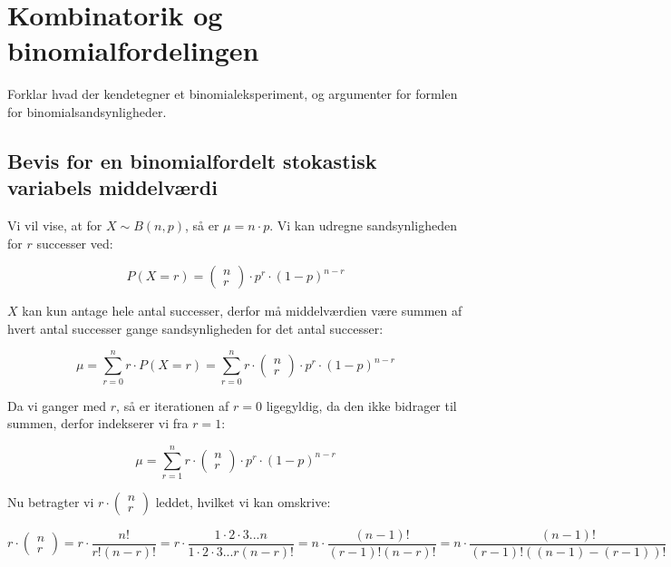 
\section{Kombinatorik og binomialfordelingen}

Forklar hvad der kendetegner et binomialeksperiment, og argumenter for formlen for binomialsandsynligheder. 

\subsection{Bevis for en binomialfordelt stokastisk variabels middelværdi}

\begin{proofw}
    
Vi vil vise, at for $X \sim B(n,p)$, så er $\mu=n\cdot p$.
Vi kan udregne sandsynligheden for $r$ successer ved:

$$
    P(X=r)=\begin{pmatrix}
        n \\ r
    \end{pmatrix}
    \cdot p^r \cdot (1-p)^{n-r}
$$

$X$ kan kun antage hele antal successer, derfor må
middelværdien være summen af hvert antal successer gange sandsynligheden for det antal successer:

$$
\mu =\sum_{r=0}^{n} r\cdot P(X=r)=
\sum_{r=0}^{n} r \cdot \begin{pmatrix}
        n \\ r
    \end{pmatrix}
    \cdot p^r \cdot (1-p)^{n-r}
$$

Da vi ganger med $r$, så er iterationen af $r=0$ ligegyldig, da den ikke bidrager til summen,
derfor indekserer vi fra $r=1$:

$$
\mu =
\sum_{r=1}^{n} r \cdot \begin{pmatrix}
        n \\ r
    \end{pmatrix}
    \cdot p^r \cdot (1-p)^{n-r}
$$

Nu betragter vi $r \cdot \begin{pmatrix}
        n \\ r
    \end{pmatrix}$ leddet, hvilket vi kan omskrive:

$$
    r \cdot \begin{pmatrix}
        n \\ r
    \end{pmatrix}
    =
    r \cdot \frac{n!}{r!(n-r)!}
    =
    r \cdot \frac{1 \cdot 2 \cdot 3 ... n}{
        1 \cdot 2 \cdot 3...r(n-r)!
    }
    =n \cdot \frac{(n-1)!}{
        (r-1)!(n-r)!
    }
    =
    n \cdot \frac{(n-1)!}{
        (r-1)!((n-1)-(r-1))!
    }
$$


\end{proofw}
